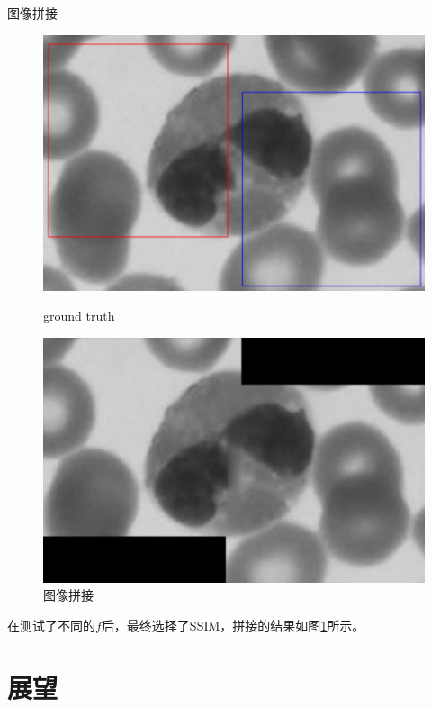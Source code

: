 \documentclass[10pt]{beamer}
\begin{document}
\begin{frame}[fragile]{图像拼接}
  \begin{figure}[htbp]
    \centering
    \begin{minipage}[t]{0.49\textwidth}
    \centering
    \includegraphics[width=1\linewidth]{imgs/gt_image.png}
    \caption{ground truth}
    \end{minipage}
    \begin{minipage}[t]{0.49\textwidth}
    \centering
    \includegraphics[width=1\linewidth]{imgs/result_image.png}
    \caption{图像拼接}
    \label{fig:res}
    \end{minipage}
    \end{figure}
  
  在测试了不同的$f$后，最终选择了SSIM，拼接的结果如图\ref{fig:res}所示。
\end{frame}

\section{展望}
\end{document}
